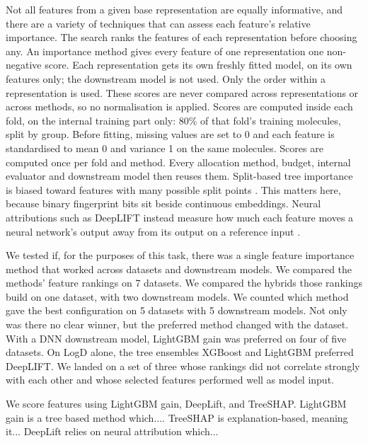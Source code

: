 Not all features from a given base representation are equally informative, and there are a variety of techniques that can assess each feature's relative importance. The search ranks the features of each representation before choosing any. An importance method gives every feature of one representation one non-negative score. Each representation gets its own freshly fitted model, on its own features only; the downstream model is not used. Only the order within a representation is used. These scores are never compared across representations or across methods, so no normalisation is applied. Scores are computed inside each fold, on the internal training part only: 80\% of that fold's training molecules, split by group. Before fitting, missing values are set to 0 and each feature is standardised to mean 0 and variance 1 on the same molecules. Scores are computed once per fold and method. Every allocation method, budget, internal evaluator and downstream model then reuses them. Split-based tree importance is biased toward features with many possible split points \citep{Strobl2007}. This matters here, because binary fingerprint bits sit beside continuous embeddings. Neural attributions such as DeepLIFT instead measure how much each feature moves a neural network's output away from its output on a reference input \citep{Ancona2018}.

We tested if, for the purposes of this task, there was a single feature importance method that worked across datasets and downstream models. We compared the methods' feature rankings on 7 datasets. We compared the hybrids those rankings build on one dataset, with two downstream models. We counted which method gave the best configuration on 5 datasets with 5 downstream models. Not only was there no clear winner, but the preferred method changed with the dataset. With a DNN downstream model, LightGBM gain was preferred on four of five datasets. On LogD alone, the tree ensembles XGBoost and LightGBM preferred DeepLIFT. We landed on a set of three whose rankings did not correlate strongly with each other and whose selected features performed well as model input.

We score features using LightGBM gain, DeepLift, and TreeSHAP. LightGBM gain is a tree based method which.... TreeSHAP is explanation-based, meaning it... DeepLift relies on neural attribution which...

